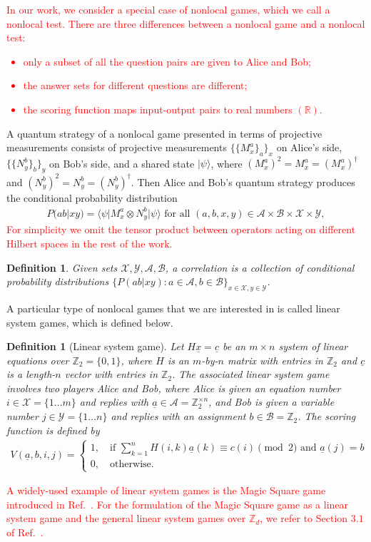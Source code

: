 \documentclass[11pt,letterpaper]{article}
\newcommand{\ket}[1]{|#1\rangle}
\newcommand{\bra}[1]{\langle#1|}
\newcommand{\x}{\otimes}
\newcommand{\R}{\mathbb{R}}
\newcommand{\Z}{\mathbb{Z}}
\newcommand{\calX}{\mathcal{X}}
\newcommand{\calY}{\mathcal{Y}}
\newcommand{\calA}{\mathcal{A}}
\newcommand{\calB}{\mathcal{B}}
\newcommand{\1}{\mathbb{1}}
\newcommand{\ux}{\underline{x}}
\newcommand{\uc}{\underline{c}}
\newcommand{\ua}{\underline{a}}
\newcommand{\pr}[2]{P(#1|#2)}
\newcommand{\hf}[1]{\textcolor{red}{#1}}
\newtheorem{definition}[theorem]{Definition}
\theoremstyle{definition}
\begin{document}
\hf{In our work, we consider a special case of nonlocal games, which we call a nonlocal test.
There are three differences between a nonlocal game and a nonlocal test:
\begin{itemize}
	\item only a subset of all the question pairs are given to Alice and Bob;
	\item the answer sets for different questions are different;
	\item the scoring function maps input-output pairs to real numbers $(\R)$.
\end{itemize}
}

A quantum strategy of a nonlocal game presented in terms of projective measurements
consists of projective measurements $\{\{M_x^a\}_a\}_x$ on Alice's side, 
$\{\{N_y^b\}_b\}_y$ on Bob's side, and a shared state $\ket{\psi}$, where 
$(M_x^a)^2 = M_x^a = (M_x^a)^\dagger$ and $(N_y^b)^2 = N_y^b = (N_y^b)^\dagger$.
Then Alice and Bob's quantum strategy produces the conditional probability distribution
\begin{align}
	\pr{ab}{xy} = \bra{\psi} M_x^a \x N_y^b \ket{\psi} \text{ for all } (a,b,x,y) \in \calA \times \calB \times \calX \times \calY,
\end{align}
\hf{For simplicity we omit the tensor product between operators acting on different Hilbert spaces in the rest of the work.}

\begin{definition}
	Given sets $\calX, \calY, \calA, \calB$, a correlation is a collection of conditional probability distributions
	$\{\pr{ab}{xy}: a \in \calA, b \in \calB\}_{x \in \calX, y \in \calY}$.
\end{definition}
A particular type of nonlocal games that we are interested in is called linear system games, which is defined below.
\begin{definition}[Linear system game]
 Let $H\ux = \uc$ be an $m \times n$ system of linear equations over $\Z_2 = \{0, 1\}$,
 where $H$ is an $m$-by-$n$ matrix with entries in $\Z_2$ and 
 $\uc$ is a length-$n$ vector with entries in $\Z_2$. 
 The associated linear system game involves two
 players Alice and Bob, where Alice is given an equation number $i \in \calX = \{1 \dots m\}$ and replies with $\ua \in \calA = \Z_2^{\times n}$,
 and Bob is given a variable number $j \in \calY = \{1 \dots n\}$ and replies with an assignment $b \in \calB = \Z_2$. The 
 scoring function is defined by
 \begin{align}
 	V(\ua, b, i, j) =
	\begin{cases}
		1, \quad \text{if } \sum_{k= 1}^n H(i,k) \ua(k) \equiv c(i) \pmod 2 \text{ and } \ua(j) = b \\
		0,  \quad \text{otherwise.}
	\end{cases}
\end{align}
\end{definition}
\hf{A widely-used example of linear system games is the Magic Square game introduced in Ref.~\cite{magic_square}.
For the formulation of the Magic Square game as a linear system game
and the general linear system games over $\Z_d$, we refer to Section $3.1$ of Ref.~\cite{coladan2017}.}
\end{document}
